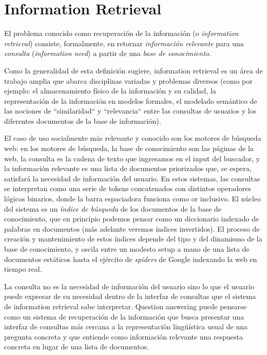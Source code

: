 \section{Information Retrieval}
\label{sec:information-retrieval}
\label{subsec:information-retrieval}

El problema conocido como recuperación de la información (o \textit{information retrieval}) consiste, formalmente, en retornar \textit{información relevante} para una \textit{consulta} (\textit{information need}) a partir de una \textit{base de conocimiento}.

Como la generalidad de esta definición sugiere, information retrieval es un área de trabajo amplia que abarca disciplinas variadas y problemas diversos (como por ejemplo: el almacenamiento físico de la información y su calidad, la representación de la información en modelos formales, el modelado semántico de las nociones de ``similaridad`` y ``relevancia`` entre las consultas de usuarios y los diferentes documentos de la base de información).

El caso de uso socialmente más relevante y conocido son los motores de búsqueda web: en los motores de búsqueda, la base de conocimiento son las páginas de la web, la consulta es la cadena de texto que ingresamos en el input del buscador, y la información relevante es una lista de documentos priorizados que, se espera, satisfará la necesidad de información del usuario. En estos sistemas, las consultas se interpretan como una serie de tokens concatenados con distintos operadores lógicos binarios, donde la barra espaciadora funciona como or inclusivo. El núcleo del sistema es un \textit{índice de búsqueda} de los documentos de la base de conocimiento, que en principio podemos pensar como un diccionario indexado de palabras en documentos (más adelante veremos índices invertidos). El proceso de creación y mantenimiento de estos índices depende del tipo y del dinamismo de la base de conocimiento, y oscila entre un modesto setup a mano de una lista de documentos estáticos hasta el ejército de \textit{spiders} de Google indexando la web en tiempo real.

La consulta no es la necesidad de información del usuario sino lo que el usuario puede expresar de su necesidad dentro de la interfaz de consultas que el sistema de information retrieval sabe interpretar. Question answering puede pensarse como un sistema de recuperación de la información que busca presentar una interfaz de consultas más cercana a la representación lingüística usual de una pregunta concreta y que entiende como información relevante una respuesta concreta en lugar de una lista de documentos.


